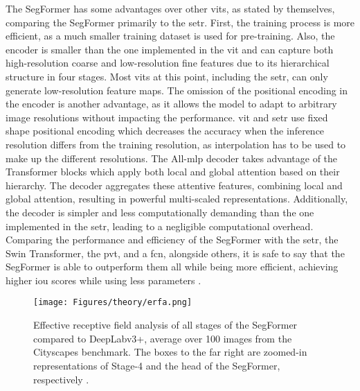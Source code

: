 The SegFormer has some advantages over other \glspl{vit}, as stated by \textcite{Xie.Wang.ea2021} themselves, comparing the SegFormer primarily to the \gls{setr}. First, the training process is more efficient, as a much smaller training dataset is used for pre-training. Also, the encoder is smaller than the one implemented in the \gls{vit} and can capture both high-resolution coarse and low-resolution fine features due to its hierarchical structure in four stages. Most \glspl{vit} at this point, including the \gls{setr}, can only generate low-resolution feature maps. The omission of the positional encoding in the encoder is another advantage, as it allows the model to adapt to arbitrary image resolutions without impacting the performance. \gls{vit} and \gls{setr} use fixed shape positional encoding which decreases the accuracy when the inference resolution differs from the training resolution, as interpolation has to be used to make up the different resolutions. The All-\gls{mlp} decoder takes advantage of the Transformer blocks which apply both local and global attention based on their hierarchy. The decoder aggregates these attentive features, combining local and global attention, resulting in powerful multi-scaled representations. Additionally, the decoder is simpler and less computationally demanding than the one implemented in the \gls{setr}, leading to a negligible computational overhead. Comparing the performance and efficiency of the SegFormer with the \gls{setr}, the Swin Transformer, the \gls{pvt}, and a \gls{fcn}, alongside others, it is safe to say that the SegFormer is able to outperform them all while being more efficient, achieving higher \gls{iou} scores while using less parameters \autocite{Lin.Cheng.ea2023,Tzepkenlis.Marthoglou.ea2023,Wang.Wang.ea2023,Xie.Wang.ea2021}.

\begin{figure}[htb]
    \centering
    \texttt{[image: Figures/theory/erfa.png]}
    \caption[Effective Receptive Field Analysis of the SegFormer]{Effective receptive field analysis of all stages of the SegFormer compared to DeepLabv3+, average over 100 images from the Cityscapes benchmark. The boxes to the far right are zoomed-in representations of Stage-4 and the head of the SegFormer, respectively \autocite{Xie.Wang.ea2021}.}
    \label{fig:erfa}
\end{figure}

